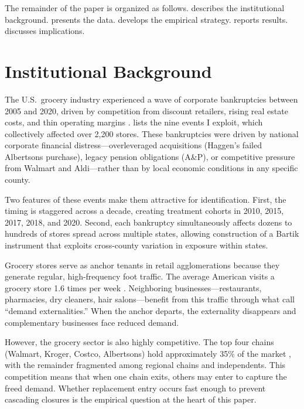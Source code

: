 \documentclass[12pt]{article}
\begin{document}
The remainder of the paper is organized as follows.  describes the institutional background.  presents the data.  develops the empirical strategy.  reports results.  discusses implications.


\section{Institutional Background}
\label{sec:background}

The U.S.\ grocery industry experienced a wave of corporate bankruptcies between 2005 and 2020, driven by competition from discount retailers, rising real estate costs, and thin operating margins \citep{ellickson2007does}.  lists the nine events I exploit, which collectively affected over 2,200 stores. These bankruptcies were driven by national corporate financial distress---overleveraged acquisitions (Haggen's failed Albertsons purchase), legacy pension obligations (A\&P), or competitive pressure from Walmart and Aldi---rather than by local economic conditions in any specific county.

Two features of these events make them attractive for identification. First, the timing is staggered across a decade, creating treatment cohorts in 2010, 2015, 2017, 2018, and 2020. Second, each bankruptcy simultaneously affects dozens to hundreds of stores spread across multiple states, allowing construction of a Bartik instrument that exploits cross-county variation in exposure within states.

Grocery stores serve as anchor tenants in retail agglomerations because they generate regular, high-frequency foot traffic. The average American visits a grocery store 1.6 times per week \citep{fmi2023grocery}. Neighboring businesses---restaurants, pharmacies, dry cleaners, hair salons---benefit from this traffic through what \citet{konishi2005concentration} call ``demand externalities.'' When the anchor departs, the externality disappears and complementary businesses face reduced demand.

However, the grocery sector is also highly competitive. The top four chains (Walmart, Kroger, Costco, Albertsons) hold approximately 35\% of the market \citep{usda2023ers}, with the remainder fragmented among regional chains and independents. This competition means that when one chain exits, others may enter to capture the freed demand. Whether replacement entry occurs fast enough to prevent cascading closures is the empirical question at the heart of this paper.
\end{document}
